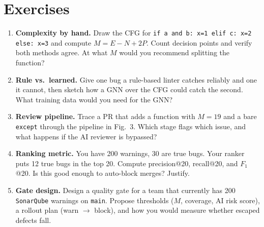 \section{Exercises}\label{sec:quality-ex}
\begin{enumerate}[label=E5.\arabic*, leftmargin=*, itemsep=0.75em]
  \item \textbf{Complexity by hand.} Draw the CFG for \texttt{if a and b: x=1 elif c: x=2 else: x=3} and compute $M=E-N+2P$. Count decision points and verify both methods agree. At what $M$ would you recommend splitting the function?
  \item \textbf{Rule vs.\ learned.} Give one bug a rule-based linter catches reliably and one it cannot, then sketch how a GNN over the CFG could catch the second. What training data would you need for the GNN?
  \item \textbf{Review pipeline.} Trace a PR that adds a function with $M=19$ and a bare \texttt{except} through the pipeline in Fig.~3. Which stage flags which issue, and what happens if the AI reviewer is bypassed?
  \item \textbf{Ranking metric.} You have 200 warnings, 30 are true bugs. Your ranker puts 12 true bugs in the top 20. Compute precision@20, recall@20, and $F_1$@20. Is this good enough to auto-block merges? Justify.
  \item \textbf{Gate design.} Design a quality gate for a team that currently has 200 \texttt{SonarQube} warnings on \texttt{main}. Propose thresholds ($M$, coverage, AI risk score), a rollout plan (warn $\to$ block), and how you would measure whether escaped defects fall.
\end{enumerate}
